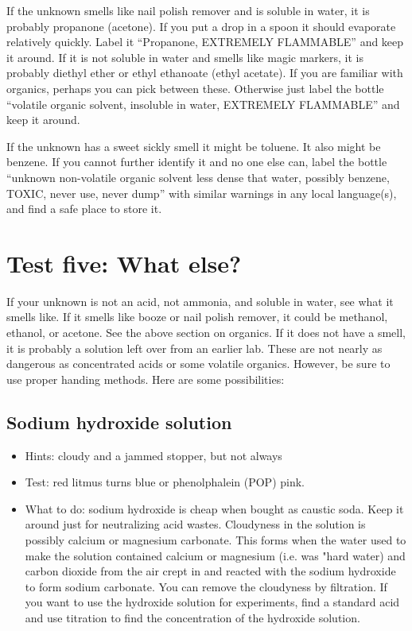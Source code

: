 If the unknown smells like nail polish remover 
and is soluble in water, 
it is probably propanone (acetone). 
If you put a drop in a spoon it should evaporate relatively quickly. 
Label it ``Propanone, 
EXTREMELY FLAMMABLE'' and keep it around. 
If it is not soluble in water and smells like magic markers, 
it is probably diethyl ether or ethyl ethanoate (ethyl acetate). 
If you are familiar with organics, 
perhaps you can pick between these. 
Otherwise just label the bottle ``volatile organic solvent, 
insoluble in water, 
EXTREMELY FLAMMABLE'' and keep it around.

If the unknown has a sweet sickly smell it might be toluene. 
It also might be benzene. 
If you cannot further identify it and no one else can, 
label the bottle ``unknown non-volatile organic solvent 
less dense that water, 
possibly benzene, 
TOXIC, 
never use, 
never dump'' with similar warnings in any local language(s), 
and find a safe place to store it.

\section{Test five: What else?}
\label{sec:whatelse}
If your unknown is not an acid, 
not ammonia, 
and soluble in water, 
see what it smells like. 
If it smells like booze or nail polish remover, 
it could be methanol, 
ethanol, 
or acetone. 
See the above section on organics. 
If it does not have a smell, 
it is probably a solution left over from an earlier lab. 
These are not nearly as dangerous as concentrated acids 
or some volatile organics. 
However, 
be sure to use proper handing methods. 
Here are some possibilities:

\subsection{Sodium hydroxide solution}

\begin{itemize}

\item{Hints: cloudy and a jammed stopper, 
but not always}

\item{Test: red litmus turns blue or phenolphalein (POP) pink.}

\item{What to do: sodium hydroxide is cheap when bought as caustic soda. 
Keep it around just for neutralizing acid wastes. 
Cloudyness in the solution is possibly calcium or magnesium carbonate. 
This forms when the water used to make the solution contained calcium or magnesium
(i.e. was "hard water) 
and carbon dioxide from the air crept in and reacted with the sodium hydroxide 
to form sodium carbonate. 
You can remove the cloudyness by filtration. 
If you want to use the hydroxide solution for experiments, 
find a standard acid 
and use titration to find the concentration of the hydroxide solution.}

\end{itemize}

